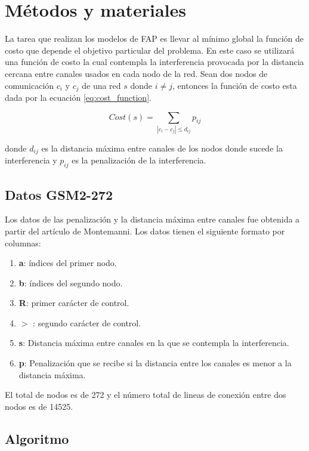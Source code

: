 
\section{Métodos y materiales}

La tarea que realizan los modelos de FAP es llevar al mínimo global la función de costo que depende el objetivo particular del problema. En este caso se utilizará una función de costo la cual contempla la interferencia provocada por la distancia cercana entre canales usados en cada nodo de la red. Sean dos nodos de comunicación $c_i$ y $c_j$ de una red $s$ donde $i\neq j$, entonces la función de costo esta dada por la ecuación \ref{eq:cost_function}.

\begin{equation}
    Cost(s) = \sum_{|c_i-c_j| \leq d_{ij}} p_{ij} \label{eq:cost_function}
\end{equation}

donde $d_{ij}$ es la distancia máxima entre canales de los nodos donde sucede la interferencia y $p_{ij}$ es la penalización de la interferencia.

\subsection{Datos GSM2-272}

Los datos de las penalización y la distancia máxima entre canales fue obtenida a partir del artículo de Montemanni\cite{Montemanni_2010,data}. Los datos tienen el siguiente formato por columnas:

\begin{enumerate}
    \item \textbf{a}: índices del primer nodo.
    \item \textbf{b}: índices del segundo nodo.
    \item \textbf{R}: primer carácter de control.
    \item $>$ : segundo carácter de control.
    \item \textbf{s}: Distancia máxima entre canales en la que se contempla la interferencia.
    \item \textbf{p}: Penalización que se recibe si la distancia entre los canales es menor a la distancia máxima.
\end{enumerate}

El total de nodos es de 272 y el número total de lineas de conexión entre dos nodos es de 14525.

\subsection{Algoritmo}

